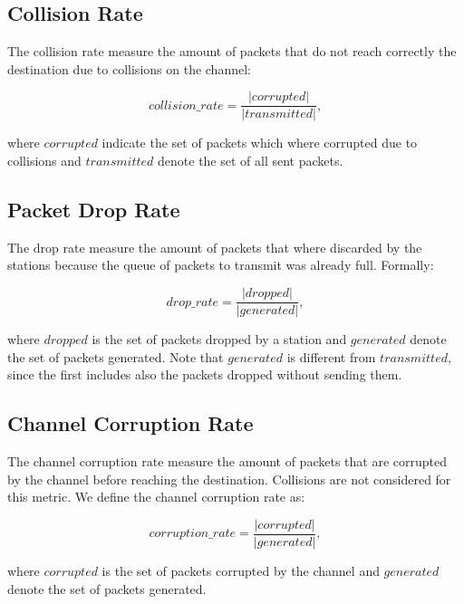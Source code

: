 \subsection{Collision Rate}
The collision rate measure the amount of packets that do not reach correctly the destination due to collisions on the channel:

\begin{equation}
    collision\_rate = \frac{|corrupted|}{|transmitted|},
\end{equation}

where $corrupted$ indicate the set of packets which where corrupted due to collisions and $transmitted$ denote the set of all sent packets.


\subsection{Packet Drop Rate}
The drop rate measure the amount of packets that where discarded by the stations because the queue of packets to transmit was already full.
Formally:

\begin{equation}
    drop\_rate = \frac{|dropped|}{|generated|},
\end{equation}

where $dropped$ is the set of packets dropped by a station and $generated$ denote the set of packets generated.
Note that $generated$ is different from $transmitted$, since the first includes also the packets dropped without sending them.


\subsection{Channel Corruption Rate}
The channel corruption rate measure the amount of packets that are corrupted by the channel before reaching the destination. Collisions are not considered for this metric.
We define the channel corruption rate as:

\begin{equation}
    corruption\_rate = \frac{|corrupted|}{|generated|},
\end{equation}

where $corrupted$ is the set of packets corrupted by the channel and $generated$ denote the set of packets generated.
